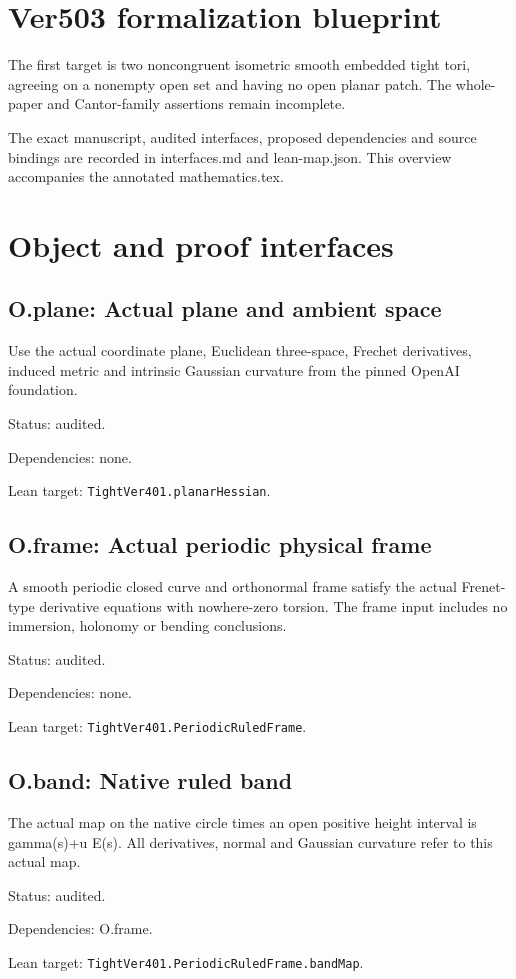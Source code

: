 \documentclass{article}
\begin{document}
\section*{Ver503 formalization blueprint}
The first target is two noncongruent isometric smooth embedded tight tori, agreeing on a nonempty open set and having no open planar patch. The whole-paper and Cantor-family assertions remain incomplete.
\par The exact manuscript, audited interfaces, proposed dependencies and source bindings are recorded in interfaces.md and lean-map.json. This overview accompanies the annotated mathematics.tex.
\section*{Object and proof interfaces}
\subsection*{O.plane: Actual plane and ambient space}
Use the actual coordinate plane, Euclidean three-space, Frechet derivatives, induced metric and intrinsic Gaussian curvature from the pinned OpenAI foundation.
\par Status: audited.
\par Dependencies: none.
\par Lean target: \texttt{TightVer401.planarHessian}.
\subsection*{O.frame: Actual periodic physical frame}
A smooth periodic closed curve and orthonormal frame satisfy the actual Frenet-type derivative equations with nowhere-zero torsion. The frame input includes no immersion, holonomy or bending conclusions.
\par Status: audited.
\par Dependencies: none.
\par Lean target: \texttt{TightVer401.PeriodicRuledFrame}.
\subsection*{O.band: Native ruled band}
The actual map on the native circle times an open positive height interval is gamma(s)+u E(s). All derivatives, normal and Gaussian curvature refer to this actual map.
\par Status: audited.
\par Dependencies: O.frame.
\par Lean target: \texttt{TightVer401.PeriodicRuledFrame.bandMap}.
\end{document}
